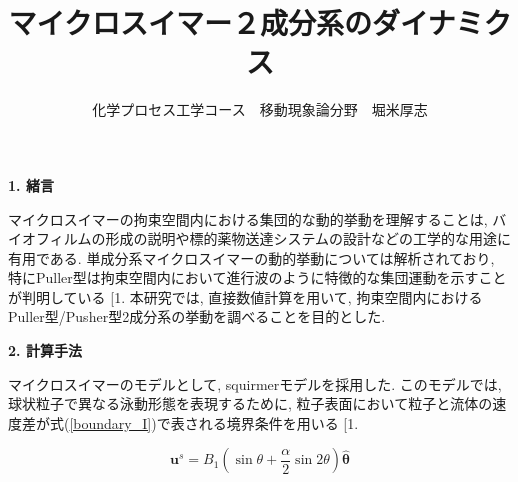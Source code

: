 \documentclass[twocolumns,10pt,a4j]{jarticle}
\title{\Large マイクロスイマー２成分系のダイナミクス\vspace{-3truemm}}
\author{\large 化学プロセス工学コース　移動現象論分野　堀米厚志\vspace{-10zh}}
\date{}
\makeatletter
\DeclareRobustCommand\cite{\unskip
  \@ifnextchar[{\@tempswatrue\@citex}{\@tempswafalse\@citex[]}}
\makeatother
\begin{document}

  \noindent		
      {\bf \large 1. 緒言}
      \par 
      マイクロスイマーの拘束空間内における集団的な動的挙動を理解することは, バイオフィルムの形成の説明や標的薬物送達システムの設計などの工学的な用途に有用である. 単成分系マイクロスイマーの動的挙動については解析されており, 特にPuller型は拘束空間内において進行波のように特徴的な集団運動を示すことが判明している\cite{1}. 本研究では, 直接数値計算を用いて, 拘束空間内におけるPuller型/Pusher型2成分系の挙動を調べることを目的とした.
     
   \noindent
       {\bf \large 2. 計算手法}
\par
        マイクロスイマーのモデルとして, squirmerモデルを採用した. このモデルでは, 球状粒子で異なる泳動形態を表現するために, 粒子表面において粒子と流体の速度差が式(\ref{boundary_I})で表される境界条件を用いる\cite{1}.

   \vspace{-3truemm}
       \begin{equation}
          \boldsymbol{u}^s = B_1\left(\sin{\theta} + \frac{\alpha}{2}\sin{2\theta}\right)\hat{\boldsymbol{\theta}}
       \label{boundary_I}
       \end{equation}
    \vspace{-4truemm}
    
\end{document}
